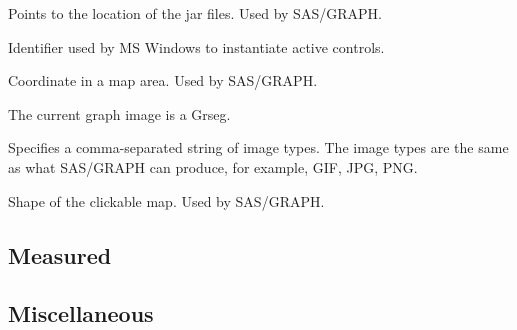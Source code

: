 \begin{description}

Points to the location of the jar files. Used by SAS/GRAPH.

Identifier used by MS Windows to instantiate active controls.

Coordinate in a map area. Used by SAS/GRAPH.

The current graph image is a Grseg.

Specifies a comma-separated string of image types. The image types are the same as what SAS/GRAPH can produce, for example, GIF, JPG, PNG.

Shape of the clickable map. Used by SAS/GRAPH.


\end{description}

\subsection{Measured}

\begin{description}



\end{description}

\subsection{Miscellaneous}

